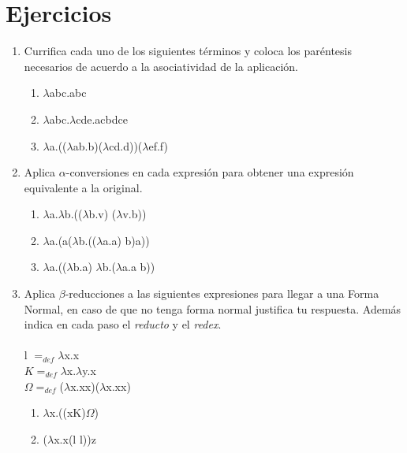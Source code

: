 \documentclass[11pt]{article}
\begin{document}
\section*{Ejercicios}

\begin{enumerate}[leftmargin=0.8cm]
    \item Currifica cada uno de los siguientes términos y coloca los paréntesis necesarios de acuerdo a la asociatividad de la aplicación.
    \begin{enumerate}
        \item $\lambda$abc.abc
        \item $\lambda$abc.$\lambda$cde.acbdce
        \item $\lambda$a.(($\lambda$ab.b)($\lambda$cd.d))($\lambda$ef.f)
    \end{enumerate}
    \item Aplica $\alpha$-conversiones en cada expresión para obtener una expresión equivalente a la original.
    \begin{enumerate}
        \item $\lambda$a.$\lambda$b.(($\lambda$b.v) ($\lambda$v.b))
        \item $\lambda$a.(a($\lambda$b.(($\lambda$a.a) b)a))
        \item $\lambda$a.(($\lambda$b.a) $\lambda$b.($\lambda$a.a b))
    \end{enumerate}
    \item Aplica $\beta$-reducciones a las siguientes expresiones para llegar a una Forma Normal, en caso de que no tenga forma normal justifica tu respuesta. Además indica en cada paso el \textit{reducto} y el \textit{redex}.\\
    \\l $= _{def}\lambda$x.x\\
    $K = _{def}\lambda$x.$\lambda$y.x\\
    $\Omega = _{def}$($\lambda$x.xx)($\lambda$x.xx)
    \begin{enumerate}
        \item $\lambda$x.((xK)$\Omega$)
        \item ($\lambda$x.x(l l))z
    \end{enumerate}
\end{enumerate}
\end{document}
